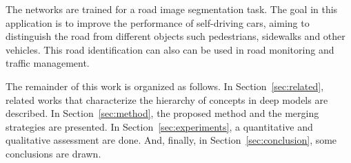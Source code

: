 The networks are trained for a road image segmentation task. The goal in this application is to improve the performance of self-driving cars, aiming to distinguish the road from different objects such pedestrians, sidewalks and other vehicles. This road identification can also can be used in road monitoring and traffic management.
 

The remainder of this work is organized as follows. In Section~\ref{sec:related}, related works that characterize the hierarchy of concepts in deep models are described. In Section~\ref{sec:method}, the proposed method and the merging strategies are presented. In Section~\ref{sec:experiments}, a quantitative and qualitative assessment are done. And, finally, in Section~\ref{sec:conclusion}, some conclusions are drawn.
